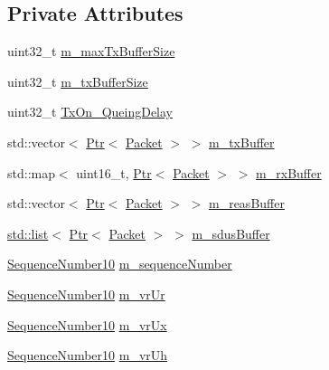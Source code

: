 \subsection*{Private Attributes}
\begin{DoxyCompactItemize}
\item 
uint32\+\_\+t \hyperlink{classns3_1_1LteRlcUmLowLat_ae50ae79e638fbeadc0a89e7a4f4371e1}{m\+\_\+max\+Tx\+Buffer\+Size}
\item 
uint32\+\_\+t \hyperlink{classns3_1_1LteRlcUmLowLat_a730b3933118b7d511e4aedab828e07aa}{m\+\_\+tx\+Buffer\+Size}
\item 
uint32\+\_\+t \hyperlink{classns3_1_1LteRlcUmLowLat_a3f4fe8416c6ad14ff611b0b57f961afa}{Tx\+On\+\_\+\+Queing\+Delay}
\item 
std\+::vector$<$ \hyperlink{classns3_1_1Ptr}{Ptr}$<$ \hyperlink{classns3_1_1Packet}{Packet} $>$ $>$ \hyperlink{classns3_1_1LteRlcUmLowLat_aaeef0eed7788f26d7564a84a0c546f74}{m\+\_\+tx\+Buffer}
\item 
std\+::map$<$ uint16\+\_\+t, \hyperlink{classns3_1_1Ptr}{Ptr}$<$ \hyperlink{classns3_1_1Packet}{Packet} $>$ $>$ \hyperlink{classns3_1_1LteRlcUmLowLat_aedc712a69598a77115ae9a67133b53d8}{m\+\_\+rx\+Buffer}
\item 
std\+::vector$<$ \hyperlink{classns3_1_1Ptr}{Ptr}$<$ \hyperlink{classns3_1_1Packet}{Packet} $>$ $>$ \hyperlink{classns3_1_1LteRlcUmLowLat_ad54250bf99ef43c98b5665f48d8a0153}{m\+\_\+reas\+Buffer}
\item 
\hyperlink{openflow-interface_8h_afd9bcfa176617760671b67580f536fa7}{std\+::list}$<$ \hyperlink{classns3_1_1Ptr}{Ptr}$<$ \hyperlink{classns3_1_1Packet}{Packet} $>$ $>$ \hyperlink{classns3_1_1LteRlcUmLowLat_af48f3f6deda08898aac5c30d9926a798}{m\+\_\+sdus\+Buffer}
\item 
\hyperlink{classns3_1_1SequenceNumber10}{Sequence\+Number10} \hyperlink{classns3_1_1LteRlcUmLowLat_a64748d117e359174d33d3d9b26663698}{m\+\_\+sequence\+Number}
\item 
\hyperlink{classns3_1_1SequenceNumber10}{Sequence\+Number10} \hyperlink{classns3_1_1LteRlcUmLowLat_a614417e6259a873e3d2dbde0d67a1df6}{m\+\_\+vr\+Ur}
\item 
\hyperlink{classns3_1_1SequenceNumber10}{Sequence\+Number10} \hyperlink{classns3_1_1LteRlcUmLowLat_a59217fd77422401b9cd0788a363e395c}{m\+\_\+vr\+Ux}
\item 
\hyperlink{classns3_1_1SequenceNumber10}{Sequence\+Number10} \hyperlink{classns3_1_1LteRlcUmLowLat_aa5ff652a885ef59bdda2446f6abd3cd8}{m\+\_\+vr\+Uh}
\item 

\end{DoxyCompactItemize}
